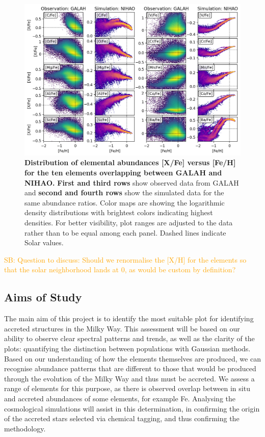 \documentclass[fleqn,usenatbib]{mnras}
\newcommand{\SB}[1]{{\textcolor{orange}{SB: #1}}}
\begin{document}
\begin{figure}
	\includegraphics[width=\textwidth]{figures/Overview_FeH_XFe_Obs_Sim.png}
    \caption{
    \textbf{Distribution of elemental abundances [X/Fe] versus [Fe/H] for the ten elements overlapping between GALAH and NIHAO.} 
    \textbf{First and third rows} show observed data from GALAH and \textbf{second and fourth rows} show the simulated data for the same abundance ratios. Color maps are showing the logarithmic density distributions with brightest colors indicating highest densities. For better visibility, plot ranges are adjusted to the data rather than to be equal among each panel. Dashed lines indicate Solar values.}
    \label{fig:allvsFeH}
\end{figure}

\SB{Question to discuss: Should we renormalise the [X/H] for the elements so that the solar neighborhood lands at 0, as would be custom by definition?}

\subsection{Aims of Study} 

The main aim of this project is to identify the most suitable plot for identifying accreted structures in the Milky Way. This assessment will be based on our ability to observe clear spectral patterns and trends, as well as the clarity of the plots: quantifying the distinction between populations with Gaussian methods. Based on our understanding of how the elements themselves are produced, we can recognise abundance patterns that are different to those that would be produced through the evolution of the Milky Way and thus must be accreted. We assess a range of elements for this purpose, as there is observed overlap between in situ and accreted abundances of some elements, for example Fe.  Analysing the cosmological simulations will assist in this determination, in confirming the origin of the accreted stars selected via chemical tagging, and thus confirming the methodology.
\end{document}
